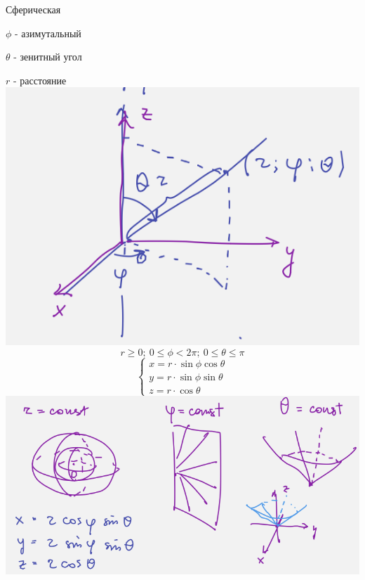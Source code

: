 \documentclass{article}
\begin{document}
\begin{minipage}{.5\textwidth}
Сферическая

$\phi$ - азимутальный 

$\theta$ - зенитный угол

$r$ - расстояние\\
\includegraphics[width=.6\textwidth]{sphere12.png} 
\begin{equation*}
    r \geq 0;\ 0\leq \phi<2\pi;\ 0\leq \theta \leq \pi
\end{equation*}
\begin{equation*}
    \begin{cases}
        x= r\cdot \sin\phi\cos\theta\\
        y = r\cdot \sin\phi \sin\theta\\
        z=r\cdot \cos\theta
    \end{cases}
\end{equation*}
\includegraphics[width=.6\textwidth]{sphereconst.png} 
\end{minipage}
\end{document}
